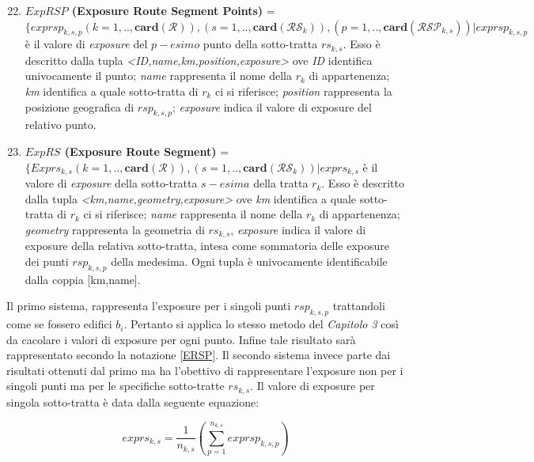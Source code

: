 \begin{enumerate}
\setcounter{enumi}{21}
\item \label{ERSP} \textbf{$ExpRSP$ (Exposure Route Segment Points)} =\\
$ \{exprsp_{k,s,p} (k=1,..,\mathbf{card}(\mathcal{R})),(s=1,..,\mathbf{card}(\mathcal{RS}_k)),(p=1,..,\mathbf{card}(\mathcal{RSP}_{k,s}))  | exprsp_{k,s,p} $ è il valore di \textit{exposure} del $p-esimo$ punto della sotto-tratta $rs_{k,s}$. Esso è descritto dalla tupla \textit{<ID,name,km,position,exposure>} ove \textit{ID} identifica univocamente il punto; \textit{name} rappresenta il nome della $r_k$ di appartenenza; \textit{km} identifica a quale sotto-tratta di $r_k$ ci si riferisce; \textit{position} rappresenta la posizione geografica di $rsp_{k,s,p}$; \textit{exposure} indica il valore di exposure del relativo punto.

\item \label{ERS} \textbf{$ExpRS$ (Exposure Route Segment)} =\\$ \{Exprs_{k,s} (k=1,..,\mathbf{card}(\mathcal{R})),(s=1,..,\mathbf{card}(\mathcal{RS}_k)) | exprs_{k,s} $ è il valore di \textit{exposure} della sotto-tratta $s-esima$ della tratta $r_k$. Esso è descritto dalla tupla \textit{<km,name,geometry,exposure>} ove \textit{km} identifica a quale sotto-tratta di $r_k$ ci si riferisce; \textit{name} rappresenta il nome della $r_k$ di appartenenza; \textit{geometry} rappresenta la geometria di $rs_{k,s}$, \textit{exposure} indica il valore di exposure della relativa sotto-tratta, intesa come sommatoria delle exposure dei punti $rsp_{k,s,p}$ della medesima. Ogni tupla è univocamente identificabile dalla coppia [km,name].

\end{enumerate}
\noindent Il primo sistema, rappresenta l'exposure per i singoli punti $rsp_{k,s,p}$ trattandoli come se fossero edifici $b_i$. Pertanto si applica lo stesso metodo del \textit{Capitolo 3} così da cacolare i valori di exposure per ogni punto. Infine tale risultato sarà rappresentato secondo la notazione \ref{ERSP}.
\bigbreak
\noindent Il secondo sistema invece parte dai risultati ottenuti dal primo ma ha l'obettivo di rappresentare l'exposure non per i singoli punti ma per le specifiche sotto-tratte $rs_{k,s}$. Il valore di exposure per singola sotto-tratta è data dalla seguente equazione:

\begin{equation}\label{eq:exprs}
exprs_{k,s}=\frac{1}{n_{k,s}}\left(\sum_{p=1}^{n_{k,s}} exprsp_{k,s,p}\right)
\end{equation}


